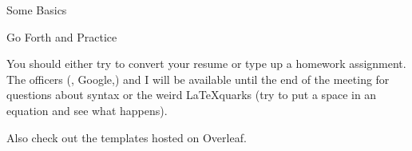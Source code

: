 \documentclass[xcolor=dvipsnames]{beamer}
\begin{document}
\begin{frame}{Some Basics} 
\lstset{language=TeX}
\scriptsize
\end{frame}

\begin{frame}{Go Forth and Practice} 

You should either try to convert your resume or type up a homework assignment.
\vfill The officers (, Google,) and I will be available until the end of the meeting for questions about syntax or the weird \LaTeX quarks (try to put a space in an equation and see what happens). 

\vfill 

Also check out the templates hosted on Overleaf. 

\end{frame}
\end{document}
